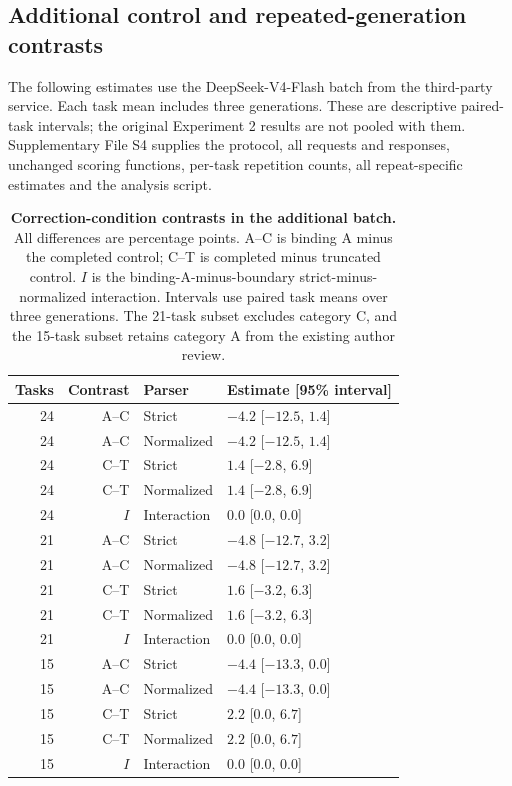 \subsection*{Additional control and repeated-generation contrasts}
The following estimates use the DeepSeek-V4-Flash batch from the third-party service. Each task mean includes three generations. These are descriptive paired-task intervals; the original Experiment 2 results are not pooled with them. Supplementary File S4 supplies the protocol, all requests and responses, unchanged scoring functions, per-task repetition counts, all repeat-specific estimates and the analysis script.

\begin{table}[H]\centering\small
\caption{\textbf{Correction-condition contrasts in the additional batch.} All differences are percentage points. A--C is binding A minus the completed control; C--T is completed minus truncated control. $I$ is the binding-A-minus-boundary strict-minus-normalized interaction. Intervals use paired task means over three generations. The 21-task subset excludes category C, and the 15-task subset retains category A from the existing author review.}
\label{tab:additive-contrasts}
\begin{tabular}{rrll}\toprule
Tasks & Contrast & Parser & Estimate [95\% interval]\\\midrule
24 & A--C & Strict & $-4.2$ [$-12.5$, $1.4$]\\
24 & A--C & Normalized & $-4.2$ [$-12.5$, $1.4$]\\
24 & C--T & Strict & $1.4$ [$-2.8$, $6.9$]\\
24 & C--T & Normalized & $1.4$ [$-2.8$, $6.9$]\\
24 & $I$ & Interaction & $0.0$ [$0.0$, $0.0$]\\
\midrule
21 & A--C & Strict & $-4.8$ [$-12.7$, $3.2$]\\
21 & A--C & Normalized & $-4.8$ [$-12.7$, $3.2$]\\
21 & C--T & Strict & $1.6$ [$-3.2$, $6.3$]\\
21 & C--T & Normalized & $1.6$ [$-3.2$, $6.3$]\\
21 & $I$ & Interaction & $0.0$ [$0.0$, $0.0$]\\
\midrule
15 & A--C & Strict & $-4.4$ [$-13.3$, $0.0$]\\
15 & A--C & Normalized & $-4.4$ [$-13.3$, $0.0$]\\
15 & C--T & Strict & $2.2$ [$0.0$, $6.7$]\\
15 & C--T & Normalized & $2.2$ [$0.0$, $6.7$]\\
15 & $I$ & Interaction & $0.0$ [$0.0$, $0.0$]\\
\bottomrule\end{tabular}
\end{table}
